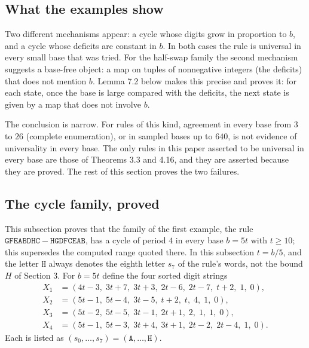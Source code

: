 \documentclass[11pt,letterpaper]{article}
\theoremstyle{paperstyle}
\theoremstyle{paperstyledef}
\theoremstyle{paperstylerem}
\begin{document}
\subsection{What the examples show}\label{what-the-examples-show}

Two different mechanisms appear: a cycle whose digits grow in proportion to \(b\), and a cycle whose deficits are constant in \(b\). In both cases the rule is universal in every small base that was tried. For the half-swap family the second mechanism suggests a base-free object: a map on tuples of nonnegative integers (the deficits) that does not mention \(b\). Lemma 7.2 below makes this precise and proves it: for each state, once the base is large compared with the deficits, the next state is given by a map that does not involve \(b\).

The conclusion is narrow. For rules of this kind, agreement in every base from \(3\) to \(26\) (complete enumeration), or in sampled bases up to \(640\), is not evidence of universality in every base. The only rules in this paper asserted to be universal in every base are those of Theorems 3.3 and 4.16, and they are asserted because they are proved. The rest of this section proves the two failures.

\subsection{The cycle family, proved}\label{the-cycle-family-proved}

This subsection proves that the family of the first example, the rule \(\mathtt{GFEABDHC} - \mathtt{HGDFCEAB}\), has a cycle of period \(4\) in every base \(b = 5t\) with \(t \geq 10\); this supersedes the computed range quoted there. In this subsection \(t = b/5\), and the letter \(\mathtt{H}\) always denotes the eighth letter \(s_7\) of the rule's words, not the bound \(H\) of Section 3. For \(b = 5t\) define the four sorted digit strings \[\begin{aligned}
X_1 &= (4t-3,\; 3t+7,\; 3t+3,\; 2t-6,\; 2t-7,\; t+2,\; 1,\; 0),\\
X_2 &= (5t-1,\; 5t-4,\; 3t-5,\; t+2,\; t,\; 4,\; 1,\; 0),\\
X_3 &= (5t-2,\; 5t-5,\; 3t-1,\; 2t+1,\; 2,\; 1,\; 1,\; 0),\\
X_4 &= (5t-1,\; 5t-3,\; 3t+4,\; 3t+1,\; 2t-2,\; 2t-4,\; 1,\; 0).
\end{aligned}\] Each is listed as \((s_0, \dots, s_7) = (\mathtt{A}, \dots, \mathtt{H})\).
\end{document}
